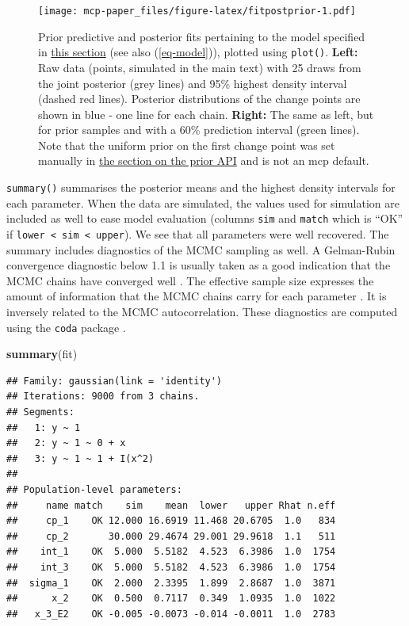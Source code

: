 \documentclass[
  american,
]{article}
\newenvironment{Shaded}{\begin{snugshade}}{\end{snugshade}}
\newcommand{\KeywordTok}[1]{\textcolor[rgb]{0.13,0.29,0.53}{\textbf{#1}}}
\newcommand{\NormalTok}[1]{#1}
\begin{document}
\begin{figure}
\centering
\texttt{[image: mcp-paper\_files/figure-latex/fitpostprior-1.pdf]}
\caption{\label{fig:fitpostprior}Prior predictive and posterior fits pertaining to the model specified in \protect\hyperlink{segments_api}{this section} (see also (\ref{eq-model})), plotted using \texttt{plot()}. \textbf{Left:} Raw data (points, simulated in the main text) with 25 draws from the joint posterior (grey lines) and 95\% highest density interval (dashed red lines). Posterior distributions of the change points are shown in blue - one line for each chain. \textbf{Right:} The same as left, but for prior samples and with a 60\% prediction interval (green lines). Note that the uniform prior on the first change point was set manually in \protect\hyperlink{priors_api}{the section on the prior API} and is not an mcp default.}
\end{figure}

\texttt{summary()} summarises the posterior means and the highest density intervals for each parameter. When the data are simulated, the values used for simulation are included as well to ease model evaluation (columns \texttt{sim} and \texttt{match} which is ``OK'' if \texttt{lower\ \textless{}\ sim\ \textless{}\ upper}). We see that all parameters were well recovered. The summary includes diagnostics of the MCMC sampling as well. A Gelman-Rubin convergence diagnostic below 1.1 is usually taken as a good indication that the MCMC chains have converged well \citep{gelman1992}. The effective sample size expresses the amount of information that the MCMC chains carry for each parameter \citep{martino2017}. It is inversely related to the MCMC autocorrelation. These diagnostics are computed using the \texttt{coda} package \citep{plummer2006}.

\begin{Shaded}
\begin{Highlighting}[]
\KeywordTok{summary}\NormalTok{(fit)}
\end{Highlighting}
\end{Shaded}

\begin{verbatim}
## Family: gaussian(link = 'identity')
## Iterations: 9000 from 3 chains.
## Segments:
##   1: y ~ 1
##   2: y ~ 1 ~ 0 + x
##   3: y ~ 1 ~ 1 + I(x^2)
## 
## Population-level parameters:
##     name match    sim    mean  lower   upper Rhat n.eff
##     cp_1    OK 12.000 16.6919 11.468 20.6705  1.0   834
##     cp_2       30.000 29.4674 29.001 29.9618  1.1   511
##    int_1    OK  5.000  5.5182  4.523  6.3986  1.0  1754
##    int_3    OK  5.000  5.5182  4.523  6.3986  1.0  1754
##  sigma_1    OK  2.000  2.3395  1.899  2.8687  1.0  3871
##      x_2    OK  0.500  0.7117  0.349  1.0935  1.0  1022
##   x_3_E2    OK -0.005 -0.0073 -0.014 -0.0011  1.0  2783
\end{verbatim}
\end{document}
